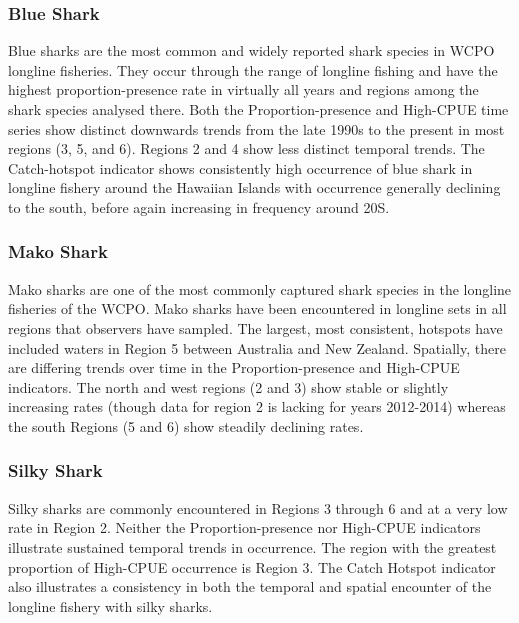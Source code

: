 \documentclass[12pt]{SCreport}
\begin{document}
        \subsubsection{Blue Shark}
Blue sharks are the most common and widely reported shark species in WCPO longline fisheries.  They occur through the range of longline fishing and have the highest proportion-presence rate in virtually all years and regions among the shark species analysed there.  Both the Proportion-presence and High-CPUE time series show distinct downwards trends from the late 1990s to the present in most regions (3, 5, and 6).  Regions 2 and 4 show less distinct temporal trends.  The Catch-hotspot indicator shows consistently high occurrence of blue shark in longline fishery around the Hawaiian Islands with occurrence generally declining to the south, before again increasing in frequency around 20\degree{}S.


\subsubsection{Mako Shark}
Mako sharks are one of the most commonly captured shark species in the longline fisheries of the WCPO.  Mako sharks have been encountered in longline sets in all regions that observers have sampled.  The largest, most consistent, hotspots have included waters in Region 5 between Australia and New Zealand.  Spatially, there are differing trends over time in the Proportion-presence and High-CPUE indicators.  The north and west regions (2 and 3) show stable or slightly increasing rates (though data for region 2 is lacking for years 2012-2014) whereas the south Regions (5 and 6) show steadily declining rates.

         
 \subsubsection{Silky Shark}
 Silky sharks are commonly encountered in Regions 3 through 6 and at a very low rate in Region 2.  Neither the Proportion-presence nor High-CPUE indicators illustrate sustained temporal trends in occurrence.  The region with the greatest proportion of High-CPUE occurrence is Region 3.  The Catch Hotspot indicator also illustrates a consistency in both the temporal and spatial encounter of the longline fishery with silky sharks.
\end{document}
